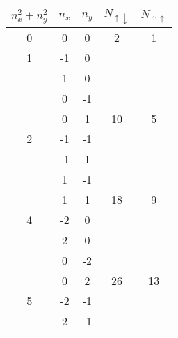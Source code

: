 \documentclass[graybox,sectrefs,envcountresetchap,open=right]{svmonodo}
\begin{document}
{\small   %

\vspace{4mm}

\begin{tabular}{ccccc}
\hline
\multicolumn{1}{c}{ $n_{x}^{2}+n_{y}^{2}$ } & \multicolumn{1}{c}{ $n_{x}$ } & \multicolumn{1}{c}{ $n_{y}$ } & \multicolumn{1}{c}{ $N_{\uparrow \downarrow }$ } & \multicolumn{1}{c}{ $N_{\uparrow \uparrow }$ } \\
\hline
0                     & 0       & 0       & 2                          & 1                        \\
\hline
1                     & -1      & 0       &                            &                          \\
                      & 1       & 0       &                            &                          \\
                      & 0       & -1      &                            &                          \\
                      & 0       & 1       & 10                         & 5                        \\
\hline
2                     & -1      & -1      &                            &                          \\
                      & -1      & 1       &                            &                          \\
                      & 1       & -1      &                            &                          \\
                      & 1       & 1       & 18                         & 9                        \\
\hline
4                     & -2      & 0       &                            &                          \\
                      & 2       & 0       &                            &                          \\
                      & 0       & -2      &                            &                          \\
                      & 0       & 2       & 26                         & 13                       \\
\hline
5                     & -2      & -1      &                            &                          \\
                      & 2       & -1      &                            &                          \\

\end{tabular}}
\end{document}
